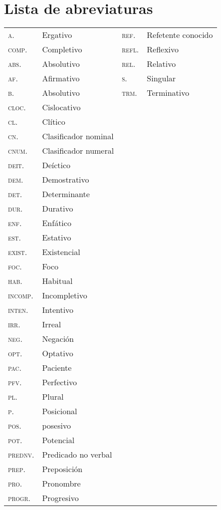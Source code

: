 \section*{Lista de abreviaturas}

\begin{tabular}{llll}
    \textsc{a.} & Ergativo & \textsc{ref.} & Refetente conocido \\
    \textsc{comp.} & Completivo &  \textsc{refl.} & Reflexivo \\
    \textsc{abs.} & Absolutivo & \textsc{rel.} & Relativo \\
    \textsc{af.} & Afirmativo & \textsc{s.} & Singular \\
    \textsc{b.} & Absolutivo & \textsc{trm.} & Terminativo \\
\textsc{cloc.} & Cislocativo \\
\textsc{cl.} & Clítico \\
\textsc{cn.} & Clasificador nominal \\
\textsc{cnum.} & Clasificador numeral \\
\textsc{deit.} & Deíctico \\
\textsc{dem.} & Demostrativo \\
\textsc{det.} & Determinante \\
\textsc{dur.} & Durativo \\
\textsc{enf.} & Enfático \\
\textsc{est.} & Estativo \\
\textsc{exist.} & Existencial \\
\textsc{foc.} & Foco \\
\textsc{hab.} & Habitual \\
\textsc{incomp.} & Incompletivo \\
\textsc{inten.} & Intentivo \\
\textsc{irr.} & Irreal \\
\textsc{neg.} & Negación \\
\textsc{opt.} & Optativo \\
\textsc{pac.} & Paciente \\
\textsc{pfv.} & Perfectivo \\
\textsc{pl.} & Plural \\
\textsc{p.} & Posicional \\
\textsc{pos.} & posesivo \\
\textsc{pot.} & Potencial \\
\textsc{prednv.} & Predicado no verbal \\
\textsc{prep.} & Preposición \\
\textsc{pro.} & Pronombre \\
\textsc{progr.} & Progresivo \\

\end{tabular}
